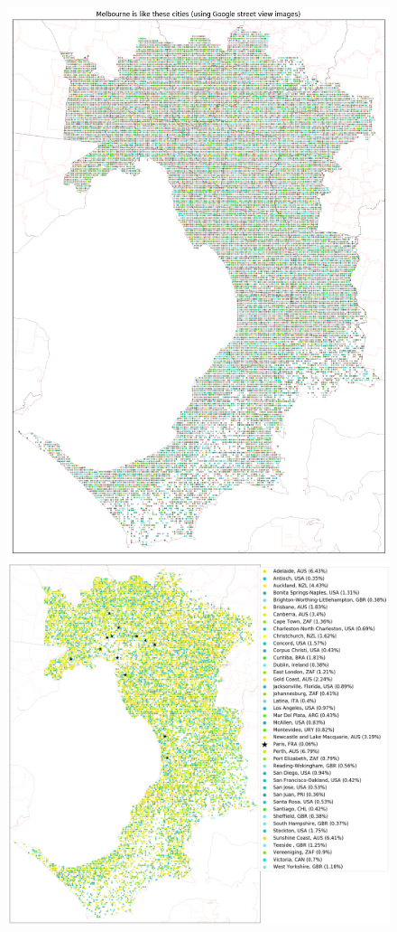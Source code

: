 \documentclass[sageh,times]{sagej}
\begin{document}

\begin{figure}[!htbp]
\centering    
\includegraphics[scale=0.25]{Images/MelbourneOverall_street.png} 
\includegraphics[scale=0.25]{Images/MelbourneOverallAbrev_street.png} 

\end{figure}
\end{document}
